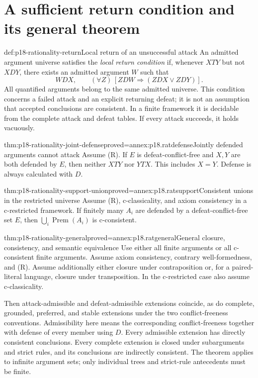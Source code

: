 \section{A sufficient return condition and its general theorem}

\begin{hbdefinition}{def:p18-rationality-return}{Local return of an unsuccessful attack}
An admitted argument universe satisfies the \emph{local return condition}
if, whenever \(X T Y\) but not \(X D Y\), there exists an admitted
argument \(W\) such that
\[
 W D X,\qquad
 (\forall Z)\,[Z D W\Longrightarrow(Z D X\lor Z D Y)].
 \tag{R}
\]
All quantified arguments belong to the same admitted universe.
This condition concerns a failed attack and an explicit returning defeat;
it is not an assumption that accepted conclusions are consistent.
In a finite framework it is decidable from the complete attack and
defeat tables. If every attack succeeds, it holds vacuously.
\end{hbdefinition}

\begin{hblemma}{thm:p18-rationality-joint-defense}{proved=annex:p18.ratdefense}{Jointly defended arguments cannot attack}
Assume (R). If \(E\) is defeat-conflict-free and \(X,Y\) are both
defended by \(E\), then neither \(X T Y\) nor \(Y T X\).
This includes \(X=Y\). Defense is always calculated with \(D\).
\end{hblemma}

\begin{hblemma}{thm:p18-rationality-support-union}{proved=annex:p18.ratsupport}{Consistent unions in the restricted universe}
Assume (R), c-classicality, and axiom consistency in a c-restricted
framework. If finitely many \(A_i\) are defended by a defeat-conflict-free
set \(E\), then \(\bigcup_i\operatorname{Prem}(A_i)\) is c-consistent.
\end{hblemma}

\begin{hbtheorem}{thm:p18-rationality-general}{proved=annex:p18.ratgeneral}{General closure, consistency, and semantic equivalence}
Use either all finite arguments or all c-consistent finite arguments.
Assume axiom consistency, contrary well-formedness, and (R).
Assume additionally either closure under contraposition or, for a
paired-literal language, closure under transposition. In the c-restricted
case also assume c-classicality.

Then attack-admissible and defeat-admissible extensions coincide, as do
complete, grounded, preferred, and stable extensions under the two
conflict-freeness conventions. Admissibility here means the corresponding
conflict-freeness together with defense of every member using \(D\).
Every admissible extension has directly consistent conclusions.
Every complete extension is closed under subarguments and strict rules,
and its conclusions are indirectly consistent.
The theorem applies to infinite argument sets; only individual trees and
strict-rule antecedents must be finite.
\end{hbtheorem}

